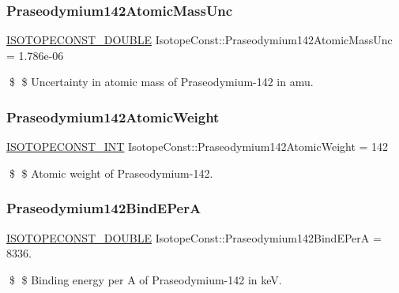 \subsubsection{\texorpdfstring{Praseodymium142\+Atomic\+Mass\+Unc}{Praseodymium142AtomicMassUnc}}
{\footnotesize\ttfamily \mbox{\hyperlink{group___isotope_const-_macros_ga8f45a7272ce02c0b4c65c44636ed719a}{I\+S\+O\+T\+O\+P\+E\+C\+O\+N\+S\+T\+\_\+\+D\+O\+U\+B\+LE}} Isotope\+Const\+::\+Praseodymium142\+Atomic\+Mass\+Unc = 1.\+786e-\/06}

\$ \$ Uncertainty in atomic mass of Praseodymium-\/142 in amu. \mbox{\label{group___isotope_const-_praseodymium-_pr142_ga734020c59b382fb95e06c9a924cb8ef1}} 
\subsubsection{\texorpdfstring{Praseodymium142\+Atomic\+Weight}{Praseodymium142AtomicWeight}}
{\footnotesize\ttfamily \mbox{\hyperlink{group___isotope_const-_macros_ga5f18360b3e99483a35c32d789e62621c}{I\+S\+O\+T\+O\+P\+E\+C\+O\+N\+S\+T\+\_\+\+I\+NT}} Isotope\+Const\+::\+Praseodymium142\+Atomic\+Weight = 142}

\$ \$ Atomic weight of Praseodymium-\/142. \mbox{\label{group___isotope_const-_praseodymium-_pr142_ga4898b877e2997d1e513f8dd7a3cd486b}} 
\subsubsection{\texorpdfstring{Praseodymium142\+Bind\+E\+PerA}{Praseodymium142BindEPerA}}
{\footnotesize\ttfamily \mbox{\hyperlink{group___isotope_const-_macros_ga8f45a7272ce02c0b4c65c44636ed719a}{I\+S\+O\+T\+O\+P\+E\+C\+O\+N\+S\+T\+\_\+\+D\+O\+U\+B\+LE}} Isotope\+Const\+::\+Praseodymium142\+Bind\+E\+PerA = 8336.}

\$ \$ Binding energy per A of Praseodymium-\/142 in keV. \mbox{\label{group___isotope_const-_praseodymium-_pr142_gaea8d9869c3e05a87c55ed761b8302b89}} 
